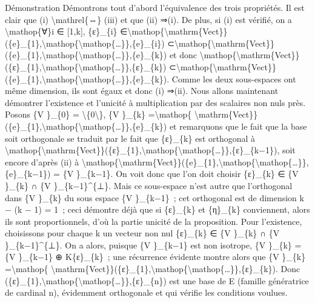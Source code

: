 \documentclass[]{article}
\begin{document}
Démonstration Démontrons tout d'abord l'équivalence des trois
propriétés. Il est clair que (i) \textbackslash{}mathrel\{⇔\} (iii) et
que (ii) ⇒(i). De plus, si (i) est vérifié, on a
\textbackslash{}mathop\{∀\}i ∈ {[}1,k{]}, \{ε\}\_\{i\}
∈\textbackslash{}mathop\{\textbackslash{}mathrm\{Vect\}\}(\{e\}\_\{1\},\textbackslash{}mathop\{\textbackslash{}mathop\{\ldots{}\}\},\{e\}\_\{i\})
⊂\textbackslash{}mathop\{\textbackslash{}mathrm\{Vect\}\}(\{e\}\_\{1\},\textbackslash{}mathop\{\textbackslash{}mathop\{\ldots{}\}\},\{e\}\_\{k\})
et donc
\textbackslash{}mathop\{\textbackslash{}mathrm\{Vect\}\}(\{ε\}\_\{1\},\textbackslash{}mathop\{\textbackslash{}mathop\{\ldots{}\}\},\{ε\}\_\{k\})
⊂\textbackslash{}mathop\{\textbackslash{}mathrm\{Vect\}\}(\{e\}\_\{1\},\textbackslash{}mathop\{\textbackslash{}mathop\{\ldots{}\}\},\{e\}\_\{k\}).
Comme les deux sous-espaces ont même dimension, ils sont égaux et donc
(i) ⇒(ii). Nous allons maintenant démontrer l'existence et l'unicité à
multiplication par des scalaires non nuls près. Posons \{V \}\_\{0\} =
\textbackslash{}\{0\textbackslash{}\}, \{V \}\_\{k\}
=\textbackslash{}mathop\{
\textbackslash{}mathrm\{Vect\}\}(\{e\}\_\{1\},\textbackslash{}mathop\{\textbackslash{}mathop\{\ldots{}\}\},\{e\}\_\{k\})
et remarquons que le fait que la base soit orthogonale se traduit par le
fait que \{ε\}\_\{k\} est orthogonal à
\textbackslash{}mathop\{\textbackslash{}mathrm\{Vect\}\}(\{ε\}\_\{1\},\textbackslash{}mathop\{\textbackslash{}mathop\{\ldots{}\}\},\{ε\}\_\{k−1\}),
soit encore d'après (ii) à
\textbackslash{}mathop\{\textbackslash{}mathrm\{Vect\}\}(\{e\}\_\{1\},\textbackslash{}mathop\{\textbackslash{}mathop\{\ldots{}\}\},\{e\}\_\{k−1\})
= \{V \}\_\{k−1\}. On voit donc que l'on doit choisir \{ε\}\_\{k\} ∈ \{V
\}\_\{k\} ∩ \{V \}\_\{k−1\}\^{}\{⊥\}. Mais ce sous-espace n'est autre
que l'orthogonal dans \{V \}\_\{k\} du sous espace \{V \}\_\{k−1\}~; cet
orthogonal est de dimension k − (k − 1) = 1~; ceci démontre déjà que si
\{ε\}\_\{k\} et \{η\}\_\{k\} conviennent, alors ils sont proportionnels,
d'où la partie unicité de la proposition. Pour l'existence, choisissons
pour chaque k un vecteur non nul \{ε\}\_\{k\} ∈ \{V \}\_\{k\} ∩ \{V
\}\_\{k−1\}\^{}\{⊥\}. On a alors, puisque \{V \}\_\{k−1\} est non
isotrope, \{V \}\_\{k\} = \{V \}\_\{k−1\} ⊕ K\{ε\}\_\{k\}~; une
récurrence évidente montre alors que \{V \}\_\{k\}
=\textbackslash{}mathop\{
\textbackslash{}mathrm\{Vect\}\}(\{ε\}\_\{1\},\textbackslash{}mathop\{\textbackslash{}mathop\{\ldots{}\}\},\{ε\}\_\{k\}).
Donc
(\{ε\}\_\{1\},\textbackslash{}mathop\{\textbackslash{}mathop\{\ldots{}\}\},\{ε\}\_\{n\})
est une base de E (famille génératrice de cardinal n), évidemment
orthogonale et qui vérifie les conditions voulues.
\end{document}
